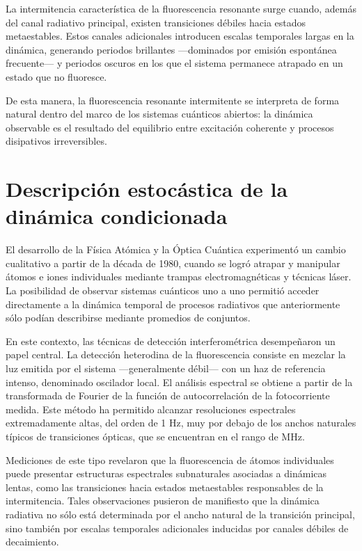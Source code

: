 \documentclass[11pt]{report}
\begin{document}
La intermitencia característica de la fluorescencia resonante surge cuando, además del canal radiativo principal, existen transiciones débiles hacia estados metaestables. Estos canales adicionales introducen escalas temporales largas en la dinámica, generando periodos brillantes —dominados por emisión espontánea frecuente— y periodos oscuros en los que el sistema permanece atrapado en un estado que no fluoresce.

De esta manera, la fluorescencia resonante intermitente se interpreta de forma natural dentro del marco de los sistemas cuánticos abiertos: la dinámica observable es el resultado del equilibrio entre excitación coherente y procesos disipativos irreversibles.

\section{Descripción estocástica de la dinámica condicionada}

El desarrollo de la Física Atómica y la Óptica Cuántica experimentó un cambio cualitativo a partir de la década de 1980, cuando se logró atrapar y manipular átomos e iones individuales mediante trampas electromagnéticas y técnicas láser. La posibilidad de observar sistemas cuánticos uno a uno permitió acceder directamente a la dinámica temporal de procesos radiativos que anteriormente sólo podían describirse mediante promedios de conjuntos.

En este contexto, las técnicas de detección interferométrica desempeñaron un papel central. La detección heterodina de la fluorescencia consiste en mezclar la luz emitida por el sistema —generalmente débil— con un haz de referencia intenso, denominado oscilador local. El análisis espectral se obtiene a partir de la transformada de Fourier de la función de autocorrelación de la fotocorriente medida. Este método ha permitido alcanzar resoluciones espectrales extremadamente altas, del orden de 1 Hz, muy por debajo de los anchos naturales típicos de transiciones ópticas, que se encuentran en el rango de MHz.

Mediciones de este tipo revelaron que la fluorescencia de átomos individuales puede presentar estructuras espectrales subnaturales asociadas a dinámicas lentas, como las transiciones hacia estados metaestables responsables de la intermitencia. Tales observaciones pusieron de manifiesto que la dinámica radiativa no sólo está determinada por el ancho natural de la transición principal, sino también por escalas temporales adicionales inducidas por canales débiles de decaimiento.
\end{document}
